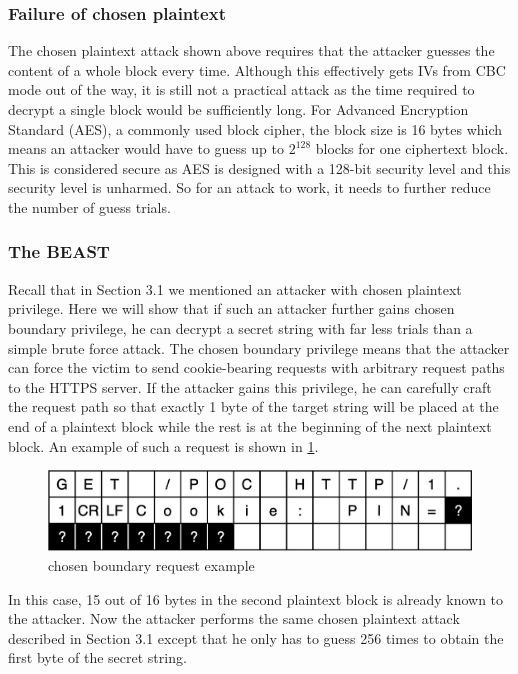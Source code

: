 \documentclass{acm_proc_article-sp}
\begin{document}
\subsubsection{Failure of chosen plaintext}
The chosen plaintext attack shown above requires that the attacker guesses the content of a whole
block every time. Although this effectively gets IVs from CBC mode out of the way, it is still not a
practical attack as the time required to decrypt a single block would be sufficiently long.
For Advanced Encryption Standard (AES), a commonly used block cipher,
the block size is 16 bytes\cite{aes} which means an attacker would have to guess up to $2^{128}$
blocks for one ciphertext block.
This is considered secure as AES is designed with a 128-bit security level\cite{seclv} and this
security level is unharmed. So for an attack to work, it needs to further reduce the number of guess
trials.
\subsubsection{The BEAST}
Recall that in Section 3.1 we mentioned an attacker with chosen plaintext privilege. Here we
will show that if such an attacker further gains chosen boundary privilege, he can decrypt a secret
string with far less trials than a simple brute force attack. The chosen boundary privilege means that
the attacker can force the victim to send cookie-bearing requests with arbitrary request paths to the
HTTPS server. If the attacker gains this privilege, he can carefully craft the request path so that
exactly 1 byte of the target string will be placed at the end of a plaintext block while the rest is at the
beginning of the next plaintext block. An example of such a request is shown in \ref{fig:req-example}.

\begin{figure}[htb]
    \centering
    \includegraphics[keepaspectratio, width=\linewidth]{./figures/request-example.png}
    \caption{chosen boundary request example}
    \label{fig:req-example}
\end{figure}
In this case, 15 out of 16 bytes in the second plaintext block is
already known to the attacker. Now the attacker performs the same chosen plaintext attack
described in Section 3.1 except that he only has to guess 256 times to obtain the first byte of the
secret string.
\end{document}
